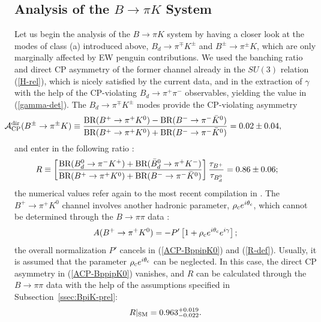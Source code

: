 \documentclass[12pt]{article}
\begin{document}
%
%
%
\boldmath
\subsection{Analysis of the $B\to\pi K$ System}\label{ssec:BpiK}
\unboldmath
%
%
%
Let us begin the analysis of the $B\to\pi K$ system by having a closer
look at the modes of class (a) introduced above, $B_d\to\pi^\mp K^\pm$
and $B^\pm\to\pi^\pm K$, which are only marginally affected by
EW penguin contributions. We used the banching ratio and direct 
CP asymmetry of the former channel already in the $SU(3)$ relation (\ref{H-rel}),
which is nicely satisfied by the current data, and in the extraction of
$\gamma$ with the help of the CP-violating $B_d\to\pi^+\pi^-$ observables,
yielding the value in  (\ref{gamma-det}). The $B_d\to\pi^\mp K^\pm$
modes provide the CP-violating asymmetry
\begin{equation}\label{ACP-BppipK0}
\hspace*{-1.9truecm}{\cal A}_{\rm CP}^{\rm dir}(B^\pm\to\pi^\pm K)\equiv
\frac{\mbox{BR}(B^+\to\pi^+K^0)-
\mbox{BR}(B^-\to\pi^-\bar K^0)}{\mbox{BR}(B^+\to\pi^+K^0)+
\mbox{BR}(B^-\to\pi^-\bar K^0)} =%
0.02 \pm 0.04,
\end{equation}
and enter in the following ratio \cite{FM}:
\begin{equation}\label{R-def}
\hspace*{-0.7truecm}R\equiv\left[\frac{\mbox{BR}(B_d^0\to\pi^- K^+)+
\mbox{BR}(\bar B_d^0\to\pi^+ K^-)}{\mbox{BR}(B^+\to\pi^+ K^0)+
\mbox{BR}(B^-\to\pi^- \bar K^0)}
\right]\frac{\tau_{B^+}}{\tau_{B^0_d}} =%
0.86\pm0.06;
\end{equation}
the numerical values refer again to the most recent compilation in \cite{HFAG}. 
The $B^+\to\pi^+ K^0$ channel involves another hadronic parameter,
$\rho_{\rm c}e^{i\theta_{\rm c}}$, which cannot be determined through
the $B\to\pi\pi$ data \cite{BF98,defan,neubert}:
\begin{equation}\label{B+pi+K0}
A(B^+\to\pi^+K^0)=-P'\left[1+\rho_{\rm c}e^{i\theta_{\rm c}}e^{i\gamma}
\right];
\end{equation}
the overall normalization $P'$ cancels in (\ref{ACP-BppipK0}) and
(\ref{R-def}). Usually, it is assumed that the parameter $\rho_{\rm c}e^{i\theta_{\rm c}}$  
can be neglected. In this case, the direct CP asymmetry in (\ref{ACP-BppipK0}) 
vanishes, and $R$ can be calculated through the $B\to\pi\pi$ data with the help 
of the assumptions specified in Subsection~\ref{ssec:BpiK-prel}:
\begin{equation}\label{R-pred-0}
R|_{\rm SM}=0.963^{+0.019}_{-0.022}.
\end{equation}
\end{document}
